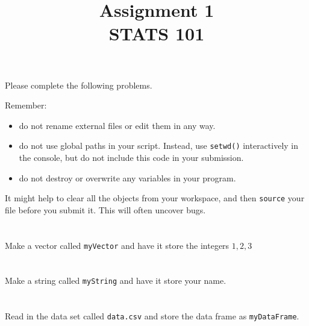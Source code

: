 \documentclass{article}
\title{Assignment 1 \\ STATS 101}
\begin{document}
\maketitle

Please complete the following problems.
\newline

Remember:
\begin{itemize}
\item do not rename external files or edit them in any way.
\item do not use global paths in your script. Instead, use \verb|setwd()| interactively in the console, but do not include this code in your submission.
\item do not destroy or overwrite any variables in your program.
\end{itemize}

It might help to clear all the objects from your workspace, and then \verb|source| your file before you submit it. This will often uncover bugs.


\section{}
Make a vector called \verb|myVector| and have it store the integers $1,2,3$


\section{}
Make a string called \verb|myString| and have it store your name.

\section{}
Read in the data set called \verb|data.csv| and store the data frame as \verb|myDataFrame|.
\end{document}
